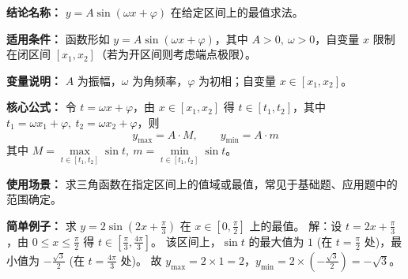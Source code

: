 \textbf{结论名称：} \(y=A\sin(\omega x+\varphi)\) 在给定区间上的最值求法。

\textbf{适用条件：} 函数形如 \(y=A\sin(\omega x+\varphi)\)，其中 \(A>0,\ \omega>0\)，自变量 \(x\) 限制在闭区间 \([x_1,x_2]\)（若为开区间则考虑端点极限）。

\textbf{变量说明：} \(A\) 为振幅，\(\omega\) 为角频率，\(\varphi\) 为初相；自变量 \(x\in[x_1,x_2]\)。

\textbf{核心公式：}
令 \(t=\omega x+\varphi\)，由 \(x\in[x_1,x_2]\) 得 \(t\in[t_1,t_2]\)，其中 \(t_1=\omega x_1+\varphi,\ t_2=\omega x_2+\varphi\)，则
\[
\boxed{y_{\max}=A\cdot M,\qquad y_{\min}=A\cdot m}
\]
其中 \(M=\max\limits_{t\in[t_1,t_2]}\sin t,\ m=\min\limits_{t\in[t_1,t_2]}\sin t\)。

\textbf{使用场景：} 求三角函数在指定区间上的值域或最值，常见于基础题、应用题中的范围确定。

\textbf{简单例子：}
求 \(y=2\sin\left(2x+\frac{\pi}{3}\right)\) 在 \(x\in\left[0,\frac{\pi}{2}\right]\) 上的最值。
解：设 \(t=2x+\frac{\pi}{3}\)，由 \(0\le x\le\frac{\pi}{2}\) 得 \(t\in\left[\frac{\pi}{3},\frac{4\pi}{3}\right]\)。
该区间上，\(\sin t\) 的最大值为 \(1\) (在 \(t=\frac{\pi}{2}\) 处)，最小值为 \(-\frac{\sqrt{3}}{2}\) (在 \(t=\frac{4\pi}{3}\) 处)。
故 \(y_{\max}=2\times1=2\)，\(y_{\min}=2\times\left(-\frac{\sqrt{3}}{2}\right)=-\sqrt{3}\)。